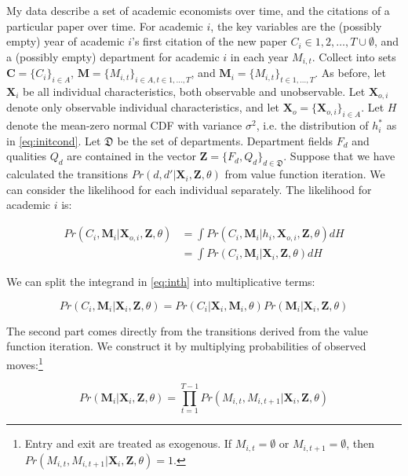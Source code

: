 \documentclass[]{article}
\begin{document}
My data describe a set of academic economists over time, and the citations of a particular paper over time.  For academic $i$, the key variables are the (possibly empty) year of academic $i$'s first citation
of the new paper $C_i \in 1,2,\dots, T \cup \emptyset$, and a (possibly empty) department for academic $i$ in each year $M_{i,t}$.  Collect into sets $\mathbf{C} = \{C_i\}_{i \in A}$,
$\mathbf{M} = \{M_{i,t}\}_{i \in A, t \in 1,\dots, T}$, and $\mathbf{M}_i = \{M_{i,t}\}_{t \in 1,\dots, T}$. 
 As before, let $\mathbf{X}_i$ be all individual characteristics, both observable and unobservable.  Let $\mathbf{X}_{o,i}$ denote only
 observable individual characteristics, and let $\mathbf{X}_o = \{\mathbf{X}_{o,i}\}_{i\in A}$. Let $H$ denote
the mean-zero normal CDF with variance $\sigma^2$, i.e. the distribution
of $h^*_i$ as in \eqref{eq:initcond}.  Let $\mathfrak{D}$ be the set of departments.  Department fields $F_d$ and qualities $Q_d$ are 
contained in the vector $\mathbf{Z} = \{F_d, Q_d\}_{d \in \mathfrak{D}}$. Suppose
that we have calculated the transitions $Pr(d,d'\vert \mathbf{X}_i, \mathbf{Z}, \theta)$ from
value function iteration. We can consider the likelihood for each
individual separately. The likelihood for academic $i$ is:

\begin{align}
    Pr(C_i,\mathbf{M}_i|\mathbf{X}_{o,i},\mathbf{Z},\theta) &= \int Pr(C_i,\mathbf{M}_i|h_i, \mathbf{X}_{o,i},\mathbf{Z},\theta) dH \nonumber \\
    &= \int Pr(C_i,\mathbf{M}_i|\mathbf{X}_i,\mathbf{Z},\theta) dH
    \label{eq:inth}
\end{align}

We can split the integrand in \eqref{eq:inth} into multiplicative terms:

\begin{equation}
    Pr(C_i,\mathbf{M}_i|\mathbf{X}_i,\mathbf{Z}, \theta) = Pr(C_i|\mathbf{X}_i, \mathbf{M}_i, \theta) Pr(\mathbf{M}_i|\mathbf{X}_i, \mathbf{Z}, \theta)
\end{equation}

The second part comes directly from the transitions derived from the
value function iteration.  We construct it by multiplying probabilities of observed
moves:\footnote{Entry and exit are treated as exogenous.  If $M_{i,t} = \emptyset$ or $M_{i,t+1} = \emptyset$, then $Pr(M_{i,t}, M_{i,t+1}\vert \mathbf{X}_i, \mathbf{Z}, \theta) = 1$.}

\begin{equation}
    Pr(\mathbf{M}_i|\mathbf{X}_i,\mathbf{Z},\theta) = \prod_{t = 1}^{T-1} Pr(M_{i,t}, M_{i,t+1}\vert \mathbf{X}_i, \mathbf{Z}, \theta)
    \label{eq:mov_liks}
\end{equation}
\end{document}
